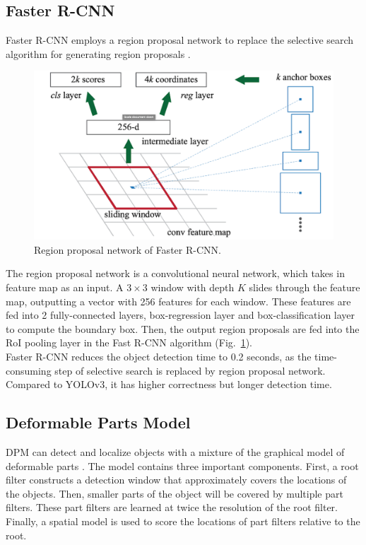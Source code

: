 \documentclass[letterpaper]{article} %
\begin{document}
\subsection{Faster R-CNN}
Faster R-CNN employs a region proposal network to replace the selective search algorithm for generating region proposals \cite{fasterRcnn}.\\
\begin{figure}[ht]
    \hspace{-17mm}
    \centering
    \includegraphics[width=0.85\linewidth,height = 0.55\linewidth]{Figure/faster_r_cnn.png}
    \caption{\footnotesize{Region proposal network of Faster R-CNN.}}
    \label{fig:rpn}
    \vspace{0mm}
\end{figure}

\noindent The region proposal network is a convolutional neural network, which takes in feature map as an input. A $3 \times 3$ window with depth $K$ slides through the feature map, outputting a vector with 256 features for each window. These features are fed into 2 fully-connected layers, box-regression layer and box-classification layer to compute the boundary box. Then, the output region proposals are fed into the RoI pooling layer in the Fast R-CNN algorithm (Fig.~\ref{fig:rpn}).\\

\noindent 
Faster R-CNN reduces the object detection time to 0.2 seconds, as the time-consuming step of selective search is replaced by region proposal network. Compared to YOLOv3, it has higher correctness but longer detection time.

\subsection{Deformable Parts Model}
\noindent DPM can detect and localize objects with a mixture of the graphical model of deformable parts \cite{DPM}. The model contains three important components. First, a root filter constructs a detection window that approximately covers the locations of the objects. Then, smaller parts of the object will be covered by multiple part filters. These part filters are learned at twice the resolution of the root filter. Finally, a spatial model is used to score the locations of part filters relative to the root.\\
\end{document}
